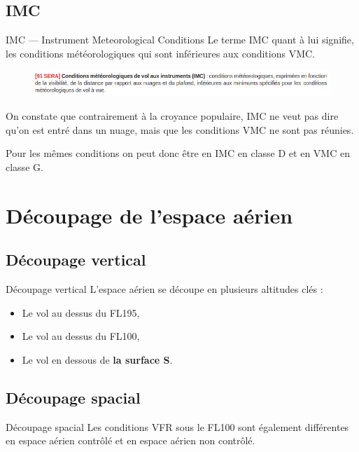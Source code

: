 \documentclass{beamer}
\begin{document}
\subsection{IMC}
\begin{frame}{IMC — Instrument Meteorological Conditions}
  Le terme IMC quant à lui signifie, les conditions météorologiques qui sont inférieures aux conditions VMC.

  \pause
  \begin{figure}
    \centering
    \includegraphics[scale=1.8]{images/sera.imc.png}
  \end{figure}

  \pause

  On constate que contrairement à la croyance populaire, IMC ne veut
  pas dire qu'on est entré dans un nuage, mais que les conditions VMC
  ne sont pas réunies.

  Pour les mêmes conditions on peut donc être en IMC en classe D et en
  VMC en classe G.
\end{frame}

\section{Découpage de l'espace aérien}
\subsection{Découpage vertical}

\begin{frame}{Découpage vertical}
  L'espace aérien se découpe en plusieurs altitudes clés :

  \begin{itemize}
    \item Le vol au dessus du FL195, \pause
    \item Le vol au dessus du FL100, \pause
    \item Le vol en dessous de \textbf{la surface S}.
  \end{itemize}

\end{frame}


\subsection{Découpage spacial}
\begin{frame}{Découpage spacial}
  Les conditions VFR sous le FL100 sont également différentes en
  espace aérien contrôlé et en espace aérien non contrôlé.
\end{frame}
\end{document}
